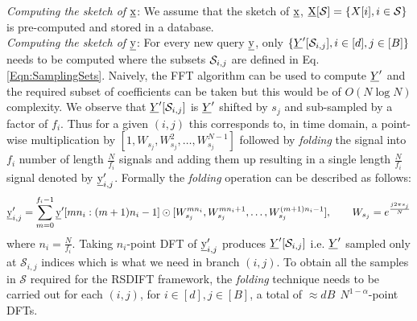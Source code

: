 \begin{enumerate}
\textit{Computing the sketch of $\underline{\mathrm{x}}$}: We assume that the sketch of $\underline{\mathrm{x}}$, $ \underline{\mathrm{X}}[\mathcal{S}]= \{X[i],i\in \mathcal{S}\}$ is pre-computed and stored in a database.  \\

\textit{Computing the sketch of $\underline{\mathrm{y}}$}: For every new query $\underline{\mathrm{y}}$, only $\{\underline{Y}'[\mathcal{S}_{i,j}],i\in[d],j\in[B]\}$ needs to be computed where the subsets $\mathcal{S}_{i,j}$ are defined in Eq. \eqref{Eqn:SamplingSets}. Naively, the FFT algorithm can be used to compute $\underline{Y}'$ and the required subset of coefficients can be taken but this would be of $O(N \log N)$ complexity. We observe that $\underline{Y}'[\mathcal{S}_{i,j}]$ is $\underline{Y}'$ shifted by $s_j$ and sub-sampled by a factor of $f_i$. Thus for a given $(i,j)$ this corresponds to, in time domain, a point-wise multiplication by $[1,W_{s_j},W_{s_j}^2,\ldots,W_{s_j}^{N-1}]$ followed by \textit{folding} the signal into $f_i$ number of length $\frac{N}{f_i}$ signals and adding them up resulting in a single length $\frac{N}{f_i}$ signal denoted by $\underline{\mathrm{y}}'_{i,j}$. Formally the \textit{folding} operation can be described as follows:
	  \begin{equation}
	  	\underline{\mathrm{y}}'_{i,j} = \sum \limits_{m = 0}^{f_i-1} \underline{\mathrm{y}}'[mn_i:(m+1)n_i-1] \odot [W_{s_j}^{mn_i},W_{s_j}^{mn_i+1},\ldots, W_{s_j}^{(m+1)n_i-1}],\qquad W_{s_j}=e^{\frac{j2\pi s_j}{N}}
	  \end{equation}
	  where $n_i=\frac{N}{f_i}$. Taking $n_i$-point DFT of $\underline{\mathrm{y}}'_{i,j}$ produces $\underline{Y}'[\mathcal{S}_{i,j}]$ i.e. $\underline{Y}'$ sampled only at $\mathcal{S}_{i,j}$ indices which is what we need in branch $(i,j)$. To obtain all the samples in $\mathcal{S}$ required for the RSDIFT framework, the \textit{folding} technique needs to be carried out for each $(i,j)$, for $i\in[d],j\in[B]$, a total of $\approx dB~~ N^{1-\alpha}$-point DFTs.
\end{enumerate}
